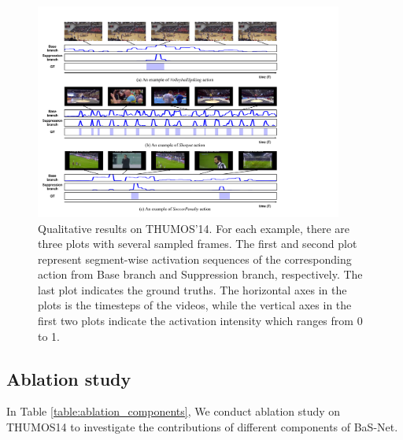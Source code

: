 \documentclass[letterpaper]{article} %
\newcommand{\Tref}[1]{Table \ref{#1}}
\begin{document}
\begin{figure}[t]
  \centering
  \includegraphics[clip=true, width=0.9\textwidth]{figure_3.pdf}
  \caption{
  Qualitative results on THUMOS'14. For each example, there are three plots with several sampled frames.
  The first and second plot represent segment-wise activation sequences of the corresponding action from Base branch and Suppression branch, respectively.
  The last plot indicates the ground truths.
  The horizontal axes in the plots is the timesteps of the videos, while the vertical axes in the first two plots indicate the activation intensity which ranges from 0 to 1.
  }
  \label{fig:qualtitative_figure}
\end{figure}

\subsection{Ablation study}
In \Tref{table:ablation_components}, We conduct ablation study on THUMOS14 to investigate the contributions of different components of BaS-Net.
\end{document}
